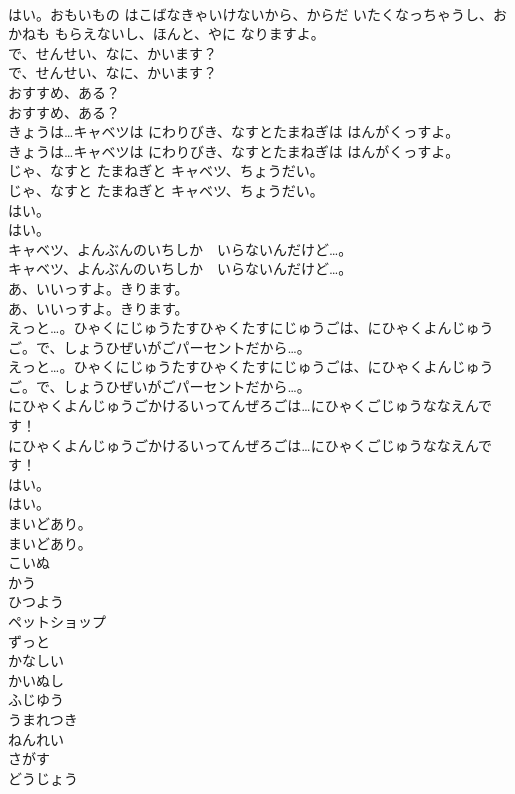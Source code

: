 \documentclass[8pt]{extreport}
\begin{document}
\begin{CJK}{UTF8}{min}
\\	はい。おもいもの はこばなきゃいけないから、からだ いたくなっちゃうし、おかねも もらえないし、ほんと、やに なりますよ。
\\	で、せんせい、なに、かいます？
\\	で、せんせい、なに、かいます？
\\	おすすめ、ある？
\\	おすすめ、ある？
\\	きょうは…キャベツは にわりびき、なすとたまねぎは はんがくっすよ。
\\	きょうは…キャベツは にわりびき、なすとたまねぎは はんがくっすよ。
\\	じゃ、なすと たまねぎと キャベツ、ちょうだい。
\\	じゃ、なすと たまねぎと キャベツ、ちょうだい。
\\	はい。
\\	はい。
\\	キャベツ、よんぶんのいちしか　いらないんだけど…。
\\	キャベツ、よんぶんのいちしか　いらないんだけど…。
\\	あ、いいっすよ。きります。
\\	あ、いいっすよ。きります。
\\	えっと…。ひゃくにじゅうたすひゃくたすにじゅうごは、にひゃくよんじゅうご。で、しょうひぜいがごパーセントだから…。
\\	えっと…。ひゃくにじゅうたすひゃくたすにじゅうごは、にひゃくよんじゅうご。で、しょうひぜいがごパーセントだから…。
\\	にひゃくよんじゅうごかけるいってんぜろごは…にひゃくごじゅうななえんです！
\\	にひゃくよんじゅうごかけるいってんぜろごは…にひゃくごじゅうななえんです！
\\	はい。
\\	はい。
\\	まいどあり。
\\	まいどあり。
\\	こいぬ
\\	かう
\\	ひつよう
\\	ペットショップ
\\	ずっと
\\	かなしい
\\	かいぬし
\\	ふじゆう
\\	うまれつき
\\	ねんれい
\\	さがす
\\	どうじょう

\end{CJK}
\end{document}
